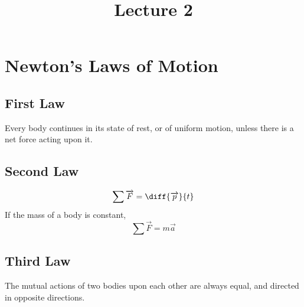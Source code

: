 \documentclass[fleqn]{article}
\title{Lecture 2}
\author{}
\date{\formatdate{30}{10}{2014}}
\begin{document}
	
\maketitle

\tableofcontents

\newpage
\section{Newton's Laws of Motion}

\subsection{First Law}

Every body continues in its state of rest, or of uniform motion, unless there is a net force acting upon it. \label{Newton's First Law}\\

\subsection{Second Law}

\begin{equation}
	\sum \overrightarrow{F} = \diff{\overrightarrow{p}}{t} \label{Newton's Second Law}
\end{equation}
If the mass of a body is constant, 
\begin{equation}
	\sum \overrightarrow{F} = m \overrightarrow{a} \label{Newton's Second Law for constant mass}
\end{equation}

\subsection{Third Law}

The mutual actions of two bodies upon each other are always equal, and directed in opposite directions. \label{Newton's Third Law}\\
\end{document}
